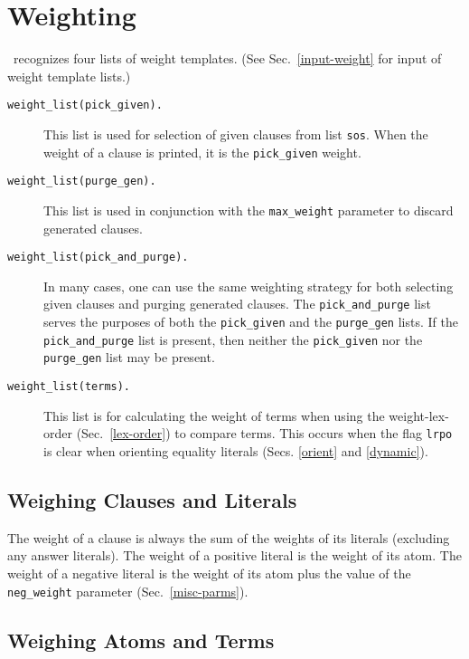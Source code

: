 \documentclass[11pt]{article}
\begin{document}
\section{Weighting} \label{weighting}

\otter\ recognizes four lists of weight templates.
(See Sec.~\ref{input-weight} for input of weight template lists.)

\begin{description}
\item[{\tt weight\_list(pick\_given).}]
This list is used for selection of given clauses from list \verb:sos:.
When the weight of a clause is printed, it is the \verb:pick_given: weight.
\item[{\tt weight\_list(purge\_gen).}]
This list is used in conjunction with the \verb:max_weight: parameter
to discard generated clauses.
\item[{\tt weight\_list(pick\_and\_purge).}]
In many cases, one can use the same weighting strategy for
both selecting given clauses and purging generated clauses.
The \verb:pick_and_purge: list serves the purposes of both the
\verb:pick_given: and the \verb:purge_gen: lists.  If the
\verb:pick_and_purge: list is present, then neither the
\verb:pick_given: nor the \verb:purge_gen: list may be present.
\item[{\tt weight\_list(terms).}]
This list is for calculating the weight of terms when using the
weight-lex-order (Sec.~\ref{lex-order}) to compare terms.
This occurs when the flag \verb:lrpo: is clear when orienting
equality literals (Secs. \ref{orient} and \ref{dynamic}).
\end{description}

\subsection{Weighing Clauses and Literals}

The weight of a clause is always the sum of the weights of its literals
(excluding any answer literals).
The weight of a positive literal is the weight of its atom.
The weight of a negative literal is the weight of its atom plus the
value of the \verb:neg_weight: parameter (Sec.~\ref{misc-parms}).

\subsection{Weighing Atoms and Terms}
\end{document}
